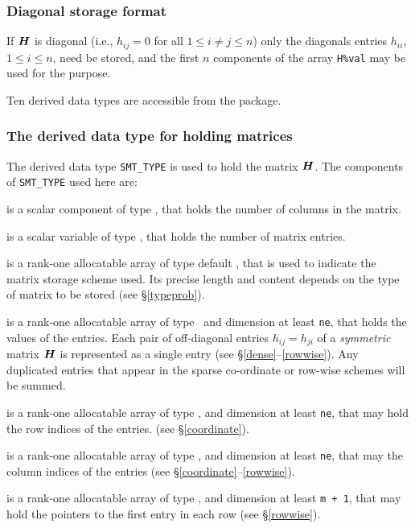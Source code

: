 \documentclass{galahad}
\begin{document}
\subsubsection{Diagonal storage format}\label{diagonal}
If ${\bm{H}}$ is diagonal (i.e., $h_{ij} = 0$ for all $1 \leq i \neq j \leq n$)
only the diagonals entries $h_{ii}$, $1 \leq i \leq n$,  need be stored,
and the first $n$ components of the array {\tt H\%val} may be used for 
the purpose. 





\galtypes
Ten derived data types are accessible from the package.


\subsubsection{The derived data type for holding matrices}\label{typesmt}
The derived data type {\tt SMT\_TYPE} is used to hold the matrix ${\bm{H}}$. 
The components of {\tt SMT\_TYPE} used here are:

\begin{description}

 is a scalar component of type \integer, 
that holds the number of columns in the matrix. 
 
 is a scalar variable of type \integer, that
holds the number of matrix entries.

 is a rank-one allocatable array of type default \character, that
is used to indicate the matrix storage scheme used. Its precise length and
content depends on the type of matrix to be stored (see \S\ref{typeprob}).

 is a rank-one allocatable array of type \realdp\, 
and dimension at least {\tt ne}, that holds the values of the entries. 
Each pair of off-diagonal entries $h_{ij} = h_{ji}$ of a {\em symmetric}
matrix ${\bm{H}}$ is represented as a single entry 
(see \S\ref{dense}--\ref{rowwise}).
Any duplicated entries that appear in the sparse 
co-ordinate or row-wise schemes will be summed. 

 is a rank-one allocatable array of type \integer, 
and dimension at least {\tt ne}, that may hold the row indices of the entries. 
(see \S\ref{coordinate}).

 is a rank-one allocatable array of type \integer, 
and dimension at least {\tt ne}, that may the column indices of the entries
(see \S\ref{coordinate}--\ref{rowwise}).

 is a rank-one allocatable array of type \integer, 
and dimension at least {\tt m + 1}, that may hold the pointers to
the first entry in each row (see \S\ref{rowwise}).

\end{description}
\end{document}
